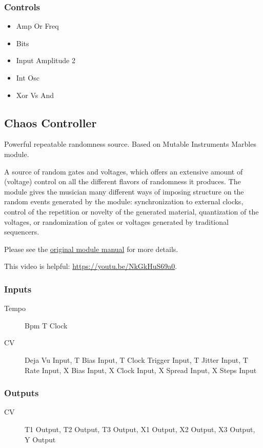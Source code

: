 \subsubsection{Controls}
\begin{itemize}
\item Amp Or Freq
\item Bits
\item Input Amplitude 2
\item Int Osc
\item Xor Vs And
\end{itemize}

\subsection{Chaos Controller}

Powerful repeatable randomness source. Based on Mutable Instruments Marbles module.

A source of random gates and voltages, which offers an extensive amount of (voltage) control on all the different flavors of randomness it produces. The module gives the musician many different ways of imposing structure on the random events generated by the module: synchronization to external clocks, control of the repetition or novelty of the generated material, quantization of the voltages, or randomization of gates or voltages generated by traditional sequencers.

Please see the \href{https://www.mutable-instruments.net/modules/marbles/manual/}{original module manual} for more details.

This video is helpful: \url{https://youtu.be/NkGkHuS69a0}.

\subsubsection{Inputs}
\begin{description}
\item [Tempo] Bpm T Clock
\item [CV] Deja Vu Input, T Bias Input, T Clock Trigger Input, T Jitter Input, T Rate Input, X Bias Input, X Clock Input, X Spread Input, X Steps Input
\end{description}

\subsubsection{Outputs}
\begin{description}
\item [CV] T1 Output, T2 Output, T3 Output, X1 Output, X2 Output, X3 Output, Y Output
\end{description}

